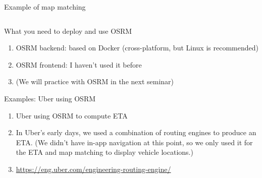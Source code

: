 \documentclass{beamer}
\begin{document}
\begin{frame}{Example of map matching}
\begin{columns}[T]
  \end{columns}
\end{frame}

\begin{frame}{What you need to deploy and use OSRM}
\begin{enumerate}
\item OSRM backend: based on Docker (cross-platform, but Linux is recommended)
\item OSRM frontend: I haven't used it before
\item (We will practice with OSRM in the next seminar)
\end{enumerate}
\end{frame}

\begin{frame}{Examples: Uber using OSRM}
\begin{enumerate}
\item Uber using OSRM to compute ETA
\item In Uber’s early days, we used a combination of routing engines to produce an ETA. (We didn’t have in-app navigation at this point, so we only used it for the ETA and map matching to display vehicle locations.)
\item \url{https://eng.uber.com/engineering-routing-engine/}
\end{enumerate}
\end{frame}
\end{document}
